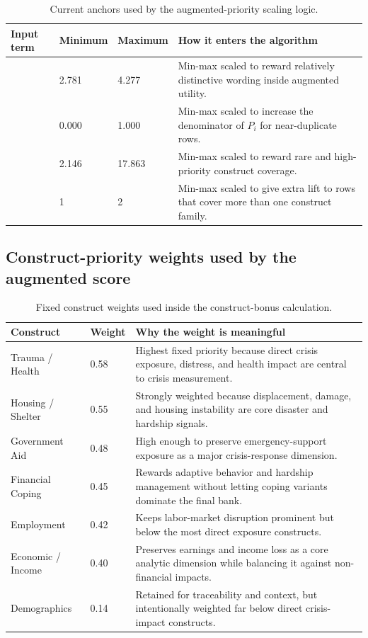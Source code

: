 \documentclass[12pt]{article}
\begin{document}
\begin{table}[H]
\centering
\footnotesize
\begin{tabularx}{\textwidth}{L{0.25\textwidth} R{0.12\textwidth} R{0.12\textwidth} Y}
\toprule
Input term & Minimum & Maximum & How it enters the algorithm \\
\midrule
{} & 2.781 & 4.277 & Min-max scaled to reward relatively distinctive wording inside augmented utility. \\
 & 0.000 & 1.000 & Min-max scaled to increase the denominator of $P_i$ for near-duplicate rows. \\
 & 2.146 & 17.863 & Min-max scaled to reward rare and high-priority construct coverage. \\
 & 1 & 2 & Min-max scaled to give extra lift to rows that cover more than one construct family. \\
\bottomrule
\end{tabularx}
\caption{Current anchors used by the augmented-priority scaling logic.}
\end{table}

\subsection{Construct-priority weights used by the augmented score}

\begin{table}[H]
\centering
\footnotesize
\begin{tabularx}{\textwidth}{L{0.30\textwidth} R{0.10\textwidth} Y}
\toprule
Construct & Weight & Why the weight is meaningful \\
\midrule
Trauma / Health & 0.58 & Highest fixed priority because direct crisis exposure, distress, and health impact are central to crisis measurement. \\
Housing / Shelter & 0.55 & Strongly weighted because displacement, damage, and housing instability are core disaster and hardship signals. \\
Government Aid & 0.48 & High enough to preserve emergency-support exposure as a major crisis-response dimension. \\
Financial Coping & 0.45 & Rewards adaptive behavior and hardship management without letting coping variants dominate the final bank. \\
Employment & 0.42 & Keeps labor-market disruption prominent but below the most direct exposure constructs. \\
Economic / Income & 0.40 & Preserves earnings and income loss as a core analytic dimension while balancing it against non-financial impacts. \\
Demographics & 0.14 & Retained for traceability and context, but intentionally weighted far below direct crisis-impact constructs. \\
\bottomrule
\end{tabularx}
\caption{Fixed construct weights used inside the construct-bonus calculation.}
\end{table}
\end{document}
